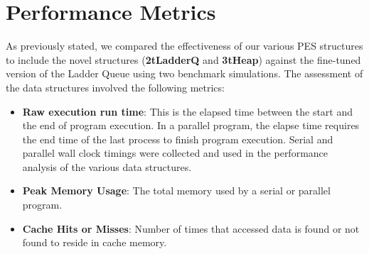 \section{Performance Metrics}
As previously stated, we compared the effectiveness of our various PES structures to include the novel structures (\textbf{2tLadderQ} and \textbf{3tHeap}) against the fine-tuned version of the Ladder Queue using two benchmark simulations. The assessment of the data structures involved the following metrics: 
\begin{itemize}
\item[\ding{182}] \textbf{Raw execution run time}: This is the elapsed time between the start and the end of program execution. In a parallel program, the elapse time requires the end time of the last process to finish program execution. Serial and parallel wall clock timings were collected and used in the performance analysis of the various data structures.
\item[\ding{186}] \textbf{Peak Memory Usage}: The total memory used by a serial or parallel program.
\item[\ding{187}] \textbf{Cache Hits or Misses}: Number of times that accessed data is found or not found to reside in cache memory.
\end{itemize}
